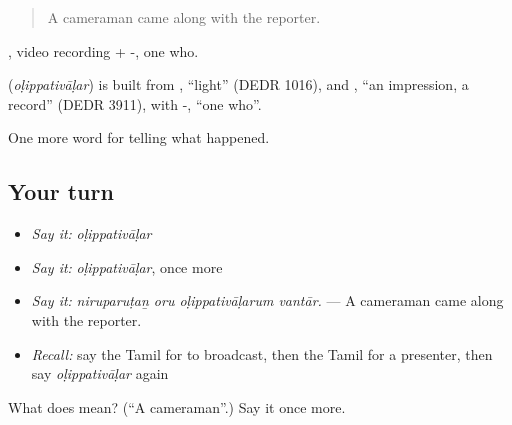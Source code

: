 \begin{quote}
A cameraman came along with the reporter.
\end{quote}

, video recording + -, one who.

\begin{cousinweb}
\textbf{} (\emph{oḷippativāḷar}) is built from , \textquotedblleft{}light\textquotedblright{} (DEDR 1016), and , \textquotedblleft{}an impression, a record\textquotedblright{} (DEDR 3911), with -, \textquotedblleft{}one who\textquotedblright{}.
\end{cousinweb}

\begin{grammarlens}[title={What you've built}]
One more word for telling what happened.
\end{grammarlens}

\subsection*{Your turn}
\begin{itemize}
\raggedright
  \item \emph{Say it:} \emph{oḷippativāḷar}
  \item \emph{Say it:} \emph{oḷippativāḷar}, once more
  \item \emph{Say it:} \emph{niruparuṭaṉ oru oḷippativāḷarum vantār.} — A cameraman came along with the reporter.
  \item \emph{Recall:} say the Tamil for to broadcast, then the Tamil for a presenter, then say \emph{oḷippativāḷar} again
\end{itemize}

\begin{tcolorbox}[breakable,colback=teal!4,colframe=teal!35!black,title={Before you move on}]
What does  mean? (\textquotedblleft{}A cameraman\textquotedblright{}.) Say it once more.
\end{tcolorbox}
